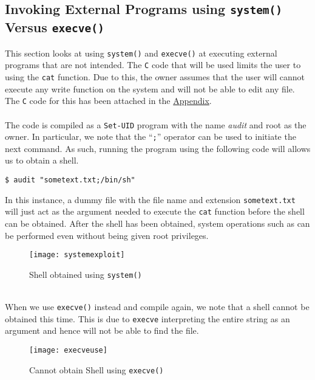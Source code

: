 \documentclass[a4paper,12pt]{article}
\begin{document}
\subsection{Invoking External Programs using \texttt{system()} Versus \texttt{execve()}}
This section looks at using \texttt{system()} and \texttt{execve()} at executing external programs that are not intended. The \texttt{C} code that will be used limits the user to using the \texttt{cat} function. Due to this, the owner assumes that the user will cannot execute any write function on the system and will not be able to edit any file. The \texttt{C} code for this has been attached in the \hyperref[Appsec:3.8]{Appendix}.\\\\
The code is compiled as a \texttt{Set-UID} program with the name \textit{audit} and root as the owner. In particular, we note that the ``\texttt{;}'' operator can be used to initiate the next command. As such, running the program using the following code will allows us to obtain a shell.
\begin{verbatim}
$ audit "sometext.txt;/bin/sh"
\end{verbatim}
In this instance, a dummy file with the file name and extension \texttt{sometext.txt} will just act as the argument needed to execute the \texttt{cat} function before the shell can be obtained. After the shell has been obtained, system operations such as  can be performed even without being given root privileges.
\begin{figure}[h]
	\centering
	\texttt{[image: systemexploit]}
	\caption{Shell obtained using \texttt{system()}}
	\label{fig:systemexploit}
\end{figure}\\
When we use \texttt{execve()} instead and compile again, we note that a shell cannot be obtained this time. This is due to \texttt{execve} interpreting the entire string as an argument and hence will not be able to find the file.
\begin{figure}[h]
	\centering
	\texttt{[image: execveuse]}
	\caption{Cannot obtain Shell using \texttt{execve()}}
	\label{fig:execveuse}
\end{figure}
\end{document}
